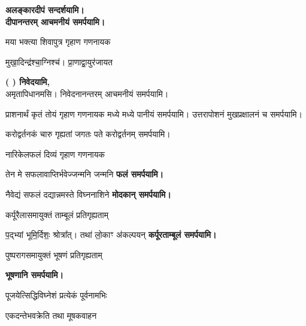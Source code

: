 \begin{center}
\textbf{\devAya{} अलङ्कारदीपं सन्दर्शयामि।\\
दीपानन्तरम् आचमनीयं समर्पयामि।}
\medskip

{मया भक्त्या शिवापुत्र गृहाण गणनायक}

{मुखा॒दिन्द्र॑श्चा॒ग्निश्च॑। प्रा॒णाद्वा॒युर॑जायत}

\textbf{\devAya{} (	) निवेदयामि,\\}
अमृतापिधानमसि। निवेदनानन्तरम् आचमनीयं समर्पयामि।\medskip

{प्राशनार्थं कृतं तोयं गृहाण गणनायक}
मध्ये मध्ये पानीयं समर्पयामि। उत्तरापोशनं मुखप्रक्षालनं च समर्पयामि।\medskip

{करोद्वर्तनकं चारु गृह्यतां जगतः पते}
करोद्वर्तनम् समर्पयामि।

{नारिकेलफलं दिव्यं गृहाण गणनायक}

{तेन मे सफलावाप्तिर्भवेज्जन्मनि जन्मनि}
\textbf{\devAya{} फलं समर्पयामि।}
\medskip

{नैवेद्यं सफलं दद्यान्नमस्ते विघ्ननाशिने}
\textbf{\devAya{} मोदकान् समर्पयामि।}
\medskip

{कर्पूरैलासमायुक्तं ताम्बूलं प्रतिगृह्यताम्}

{प॒द्भ्यां भूमि॒र्दिशः॒ श्रोत्रा᳚त्। तथा॑ लो॒काꣳ अ॑कल्पयन्}
\textbf{\devAya{} कर्पूरताम्बूलं समर्पयामि।}
\medskip



{पुष्परागसमायुक्तं भूषणं प्रतिगृह्यताम्}

\textbf{\devAya{} भूषणानि समर्पयामि।}
\medskip

{पूजयेत्सिद्धिविघ्नेशं प्रत्येकं पूर्वनामभिः}

{एकदन्तेभवक्रेति तथा मूषकवाहन}


\end{center}
